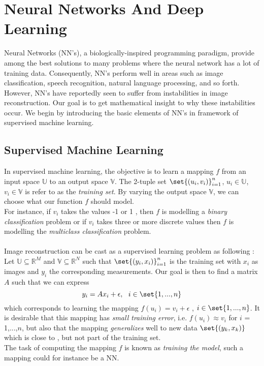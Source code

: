 \chapter{Neural Networks And Deep Learning}

Neural Networks (NN's), a biologically-inspired programming paradigm, provide among the best solutions to many problems where the neural network has a lot of training data. Consequently, NN's perform well in areas such as image classification, speech recognition, natural language processing, and so forth. However, NN's have reportedly seen to suffer from instabilities in image reconstruction. Our goal is to get mathematical insight to why these instabilities occur. We begin by introducing the basic elements of NN's in framework of supervised machine learning. 

\section{Supervised Machine Learning}
In supervised machine learning, the objective is to learn a mapping $f$ from an input space $\mathbb{U}$ to an output space $\mathbb{V}$. The 2-tuple set 
$\set{(u_i, v_i)}^{n}_{i=1}$, $u_i \in \mathbb{U}$, $v_i \in \mathbb{V}$ is refer to as the \emph{training set}.  By varying the output space $\mathbb{V}$, we can choose what our function $f$ should model. \\For instance, if $v_i$ takes the values -1 or 1 , then $f$ is modelling  a \emph{binary classification} problem or if $v_i$ takes three or more discrete values then $f$ is modelling the \emph{multiclass classification} problem. \\ \\
Image reconstruction can be cast as a supervised learning problem as following : Let $\mathbb{U} \subseteq \mathbb{R}^M$ and $\mathbb{V} \subseteq \mathbb{R}^N$ such that $\set{(y_i, x_i)}^{n}_{i=1}$ is the training set with $x_i$ as images and $y_i$ the corresponding measurements. Our goal is then to find a matrix $A$ such that we can express 
\begin{equation*}
y_i = Ax_i + \epsilon ,\  \ i \in \set{1,...,n}
\end{equation*}
which corresponds to learning the mapping $f(u_i) = v_i + \epsilon$ , $ i \in \set{1,...,n}$. It is desirable that this mapping has \emph{small training error}, i.e. $f(u_i) \approx v_i$  for $i$ = 1,...,$n$, but also that the mapping \emph{generalizes} well to new data $\set{(y_k, x_k)}$ which is close to , but not part of the training set.\\ The task of computing the mapping $f$ is known as \emph{training the model}, such a mapping could for instance be a NN.

